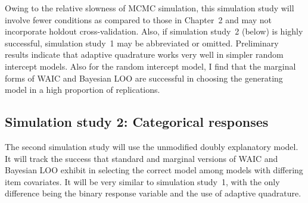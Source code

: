 \documentclass[letterpaper]{article}
\begin{document}
Owing to the relative slowness of MCMC simulation, this simulation study will involve fewer conditions as compared to those in Chapter~2 and may not incorporate holdout cross-validation. Also, if simulation study~2 (below) is highly successful, simulation study~1 may be abbreviated or omitted. Preliminary results indicate that adaptive quadrature works very well in simpler random intercept models. Also for the random intercept model, I find that the marginal forms of WAIC and Bayesian LOO are successful in choosing the generating model in a high proportion of replications.


\subsection{Simulation study 2: Categorical responses}

The second simulation study will use the unmodified doubly explanatory model. It will track the success that standard and marginal versions of WAIC and Bayesian LOO exhibit in selecting the correct model among models with differing item covariates. It will be very similar to simulation study~1, with the only difference being the binary response variable and the use of adaptive quadrature.




\end{document}
